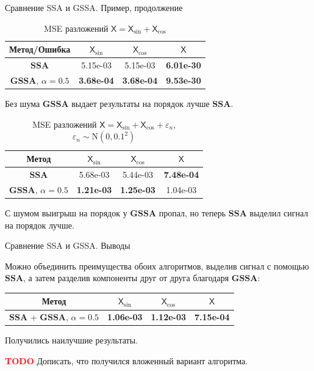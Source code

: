\documentclass[notheorems, handout]{beamer}
\newcommand{\SSA}{\textbf{SSA}}
\newcommand{\GSSA}{\textbf{GSSA}}
\newcommand{\TS}{\mathsf{X}}
\begin{document}
	
	\begin{frame}{Сравнение SSA и GSSA. Пример, продолжение}
		\begin{table}[H]
			\caption{MSE разложений $\TS = \TS_{\sin} + \TS_{\cos}$}
			\centering
			\begin{tabular}{c|ccc}
				\hline
				Метод/Ошибка & $\TS_{\sin}$ & $\TS_{\cos}$ & $\TS$ \\ 
				\hline
				$\SSA$   & 5.15e-03 & 5.15e-03 & \textbf{6.01e-30}\\ 
				$\GSSA$, $\alpha = 0.5$  & \textbf{3.68e-04} & \textbf{3.68e-04} & \textbf{9.53e-30} \\ 
				\hline
			\end{tabular}
			\label{tab:mse_ssa_gssa}
		\end{table}
		Без шума $\GSSA$ выдает результаты на порядок лучше $\SSA$.

		\begin{table}[H]
			\caption{MSE разложений $\TS = \TS_{\sin} + \TS_{\cos}+
		\varepsilon_n$, $\varepsilon_n \sim \mathrm N(0, 0.1^2)$ }
			\centering
			\begin{tabular}{c|ccc}
				\hline
				Метод & $\TS_{\sin}$ & $\TS_{\cos}$ & $\TS$ \\ 
				\hline
				$\SSA$      & 5.68e-03 & 5.44e-03 & \textbf{7.48e-04}  \\ 
				$\GSSA$, $\alpha = 0.5$ & \textbf{1.21e-03} & \textbf{1.25e-03} & 1.04e-03 \\
				\hline
			\end{tabular}
			\label{tab:errs_ssa_gssa}
		\end{table}
		С шумом выигрыш на порядок у $\GSSA$ пропал, но теперь $\SSA$ выделил сигнал на порядок лучше.

	\end{frame}
	
	
	
	\begin{frame}{Сравнение SSA и GSSA. Выводы}

		Можно объединить преимущества обоих алгоритмов, выделив сигнал с помощью $\SSA$, а затем разделив компоненты друг от друга благодаря $\GSSA$:
		\begin{table}[H]
			\label{tab:errs_ssa_gssa_united}
			\centering
			\begin{tabular}{c|ccc}
				\hline
				Метод & $\TS_{\sin}$ & $\TS_{\cos}$ & $\TS$ \\ 
				\hline
				$\SSA$ + $\GSSA$, $\alpha = 0.5$ & \textbf{1.06e-03} & \textbf{1.12e-03} & \textbf{7.15e-04} \\ 
				\hline
			\end{tabular}
		\end{table}

		Получились наилучшие результаты.

		\textcolor{red}{\textbf{TODO}} 
		Дописать, что получился вложенный вариант алгоритма.
	\end{frame}
	
\end{document}
